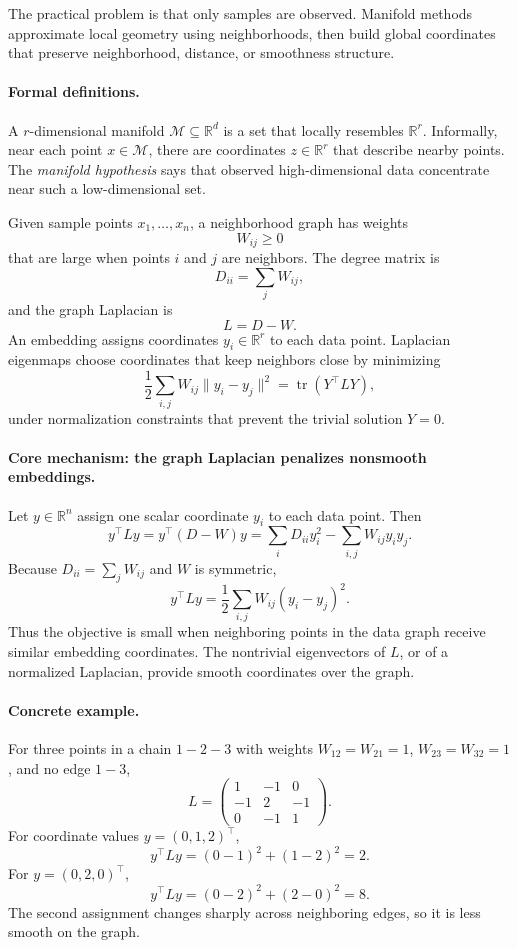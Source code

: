 The practical problem is that only samples are observed. Manifold methods approximate local geometry using neighborhoods, then build global coordinates that preserve neighborhood, distance, or smoothness structure.

\paragraph{Formal definitions.}
A \(r\)-dimensional manifold \(\mathcal M\subseteq\mathbb R^d\) is a set that locally resembles \(\mathbb R^r\). Informally, near each point \(x\in\mathcal M\), there are coordinates \(z\in\mathbb R^r\) that describe nearby points. The \emph{manifold hypothesis} says that observed high-dimensional data concentrate near such a low-dimensional set.

Given sample points \(x_1,\ldots,x_n\), a neighborhood graph has weights
\[
W_{ij}\geq0
\]
that are large when points \(i\) and \(j\) are neighbors. The degree matrix is
\[
D_{ii}=\sum_j W_{ij},
\]
and the graph Laplacian is
\[
L=D-W.
\]
An embedding assigns coordinates \(y_i\in\mathbb R^r\) to each data point. Laplacian eigenmaps choose coordinates that keep neighbors close by minimizing
\[
\boxed{
\frac12\sum_{i,j}W_{ij}\|y_i-y_j\|^2
=\operatorname{tr}(Y^\top L Y),
}
\]
under normalization constraints that prevent the trivial solution \(Y=0\).

\paragraph{Core mechanism: the graph Laplacian penalizes nonsmooth embeddings.}
Let \(y\in\mathbb R^n\) assign one scalar coordinate \(y_i\) to each data point. Then
\[
y^\top L y
=y^\top(D-W)y
=\sum_i D_{ii}y_i^2-\sum_{i,j}W_{ij}y_i y_j.
\]
Because \(D_{ii}=\sum_jW_{ij}\) and \(W\) is symmetric,
\[
\boxed{
y^\top L y
=\frac12\sum_{i,j}W_{ij}(y_i-y_j)^2.
}
\]
Thus the objective is small when neighboring points in the data graph receive similar embedding coordinates. The nontrivial eigenvectors of \(L\), or of a normalized Laplacian, provide smooth coordinates over the graph.

\paragraph{Concrete example.}
For three points in a chain \(1-2-3\) with weights \(W_{12}=W_{21}=1\), \(W_{23}=W_{32}=1\), and no edge \(1-3\),
\[
L=\begin{pmatrix}
1&-1&0\\
-1&2&-1\\
0&-1&1
\end{pmatrix}.
\]
For coordinate values \(y=(0,1,2)^\top\),
\[
y^\top L y=(0-1)^2+(1-2)^2=2.
\]
For \(y=(0,2,0)^\top\),
\[
y^\top L y=(0-2)^2+(2-0)^2=8.
\]
The second assignment changes sharply across neighboring edges, so it is less smooth on the graph.

